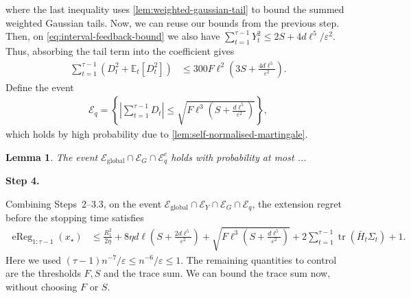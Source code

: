 \documentclass{article}
\newtheorem{lemma}[lemma]{Lemma}
\newcommand{\proofstepinline}[1]{%
    {\normalfont\normalsize\bfseries\color{blue!55!black}Step #1.}\enspace
}
\newcommand{\E}{\mathbb E}
\newcommand{\tr}{\operatorname{tr}}
\newcommand{\1}{\mathbf 1}
\newcommand{\eps}{\varepsilon}
\begin{document}
where the last inequality uses \cref{lem:weighted-gaussian-tail} to bound the summed weighted Gaussian tails.
Now, we can reuse our bounds from the previous step.
Then, on \eqref{eq:interval-feedback-bound} we also have $\sum_{t=1}^{\tau-1}Y_t^2\leq2S+4d\ell^5/\eps^2$.
Thus, absorbing the tail term into the coefficient gives
\begin{align}
    \sum_{t=1}^{\tau-1}\left(D_t^2+\E_t[D_t^2]\right)
     & \leq300F\ell^2\left(3S+\frac{4d\ell^5}{\eps^2}\right).
\end{align}
Define the event
\begin{align}
    \mathcal E_{q}
    =\left\{
    \left|\sum_{t=1}^{\tau-1}D_t\right|
    \leq\sqrt{F\ell^3\left(S+\frac{d\ell^5}{\eps^2}\right)}
    \right\},
    \label{eq:self-normalized-quadratic-event}
\end{align}
which holds by high probability due to \cref{lem:self-normalised-martingale}.
\begin{lemma}
    The event $\mathcal E_{\mathrm{global}} \cap \mathcal E_G \cap \mathcal E_{q}^c$ holds with probability at most ...
\end{lemma}
\proofstepinline{4}
Combining Steps~2--3.3, on the event
$\mathcal E_{\mathrm{global}}\cap\mathcal E_Y\cap\mathcal E_G\cap\mathcal E_q$,
the extension regret before the stopping time satisfies
\begin{align}
    \operatorname{eReg}_{1:\tau-1}(x_\star)
     & \leq
    \frac{R_1^2}{2\eta}
    +8\eta d\ell\left(S+\frac{2d\ell^5}{\eps^2}\right)
    +\sqrt{F\ell^3\left(S+\frac{d\ell^5}{\eps^2}\right)}
    +2\sum_{t=1}^{\tau-1}\tr(\bar H_t\Sigma_t)+1.
    \label{eq:stopped-regret-before-trace}
\end{align}
Here we used $(\tau-1)n^{-7}/\eps\leq n^{-6}/\eps\leq1$.
The remaining quantities to control are the thresholds $F,S$ and the trace sum.
We can bound the trace sum now, without choosing $F$ or $S$.
\end{document}
